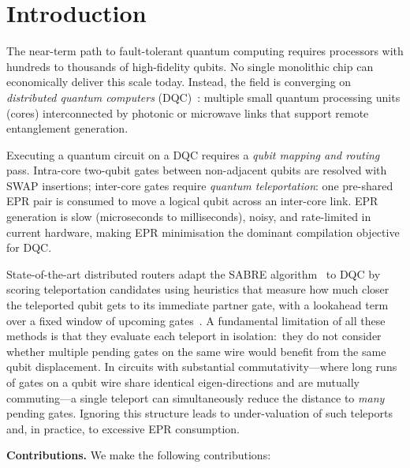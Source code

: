 \documentclass[conference]{IEEEtran}
\newcommand{\SABRE}{\textsc{SABRE}}
\begin{document}
\section{Introduction}
\label{sec:intro}

The near-term path to fault-tolerant quantum computing requires processors with
hundreds to thousands of high-fidelity qubits.
No single monolithic chip can economically deliver this scale today.
Instead, the field is converging on \emph{distributed quantum computers}
(DQC)~\cite{monroe2014large,wehner2018quantum,stephenson2020high}: multiple
small quantum processing units (cores) interconnected by photonic or microwave
links that support remote entanglement generation.

Executing a quantum circuit on a DQC requires a \emph{qubit mapping and routing}
pass.
Intra-core two-qubit gates between non-adjacent qubits are resolved with SWAP
insertions; inter-core gates require \emph{quantum teleportation}: one
pre-shared EPR pair is consumed to move a logical qubit across an inter-core
link.
EPR generation is slow (microseconds to milliseconds), noisy, and rate-limited
in current hardware, making EPR minimisation the dominant compilation objective
for DQC.

State-of-the-art distributed routers adapt the \SABRE{}
algorithm~\cite{li2019tackling} to DQC by scoring teleportation candidates using
heuristics that measure how much closer the teleported qubit gets to its
immediate partner gate, with a lookahead term over a fixed window of upcoming
gates~\cite{andres2019automated,ferrari2021compiler,wu2022collcomm,
rodrigues2022noise,baker2020time}.
A fundamental limitation of all these methods is that they evaluate each
teleport in isolation:\ they do not consider whether multiple pending gates on
the same wire would benefit from the same qubit displacement.
In circuits with substantial commutativity---where long runs of gates on a qubit
wire share identical eigen-directions and are mutually commuting---a single
teleport can simultaneously reduce the distance to \emph{many} pending gates.
Ignoring this structure leads to under-valuation of such teleports and, in
practice, to excessive EPR consumption.

\textbf{Contributions.}
We make the following contributions:
\end{document}
